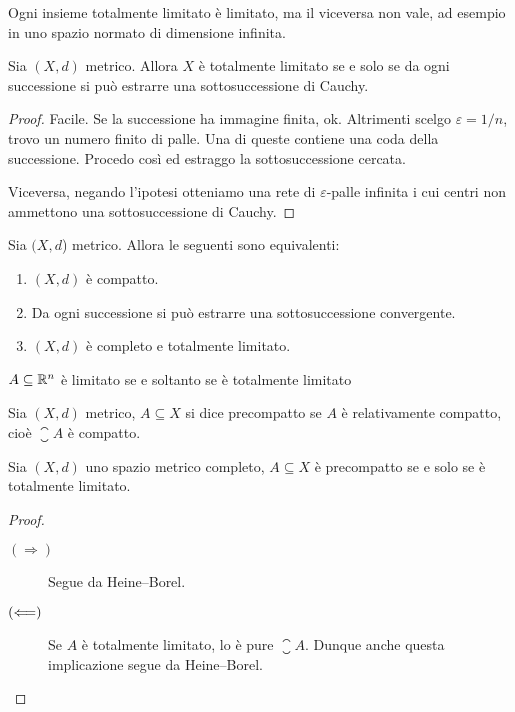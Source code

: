 \begin{remark}
	Ogni insieme totalmente limitato è limitato, ma il viceversa non vale, ad esempio in uno spazio normato di dimensione infinita.
\end{remark}

\begin{lemma}
	Sia $(X,d)$ metrico.
	Allora $X$ è totalmente limitato se e solo se da ogni successione si può estrarre una sottosuccessione di Cauchy.
\end{lemma}
\begin{proof}
	Facile. Se la successione ha immagine finita, ok. Altrimenti scelgo $\varepsilon =1/n$, trovo un numero finito di palle. Una di queste contiene una coda della successione. Procedo così ed estraggo la sottosuccessione cercata.

	Viceversa, negando l'ipotesi otteniamo una rete di $\varepsilon$-palle infinita i cui centri non ammettono una sottosuccessione di Cauchy.
\end{proof}

\begin{theorem}
\label{th:heine_borel}
	Sia $(X,d$) metrico. Allora le seguenti sono equivalenti:
	\begin{enumerate}
		\item $(X,d)$ è compatto.
		\item Da ogni successione si può estrarre una sottosuccessione convergente.
		\item $(X,d)$ è completo e totalmente limitato.
	\end{enumerate}
\end{theorem}

\begin{remark}
	$A \subseteq \mathbb{R}^n$ è limitato se e soltanto se è totalmente limitato
\end{remark}

\begin{definition}
	Sia $(X,d)$ metrico, $A \subseteq X$ si dice precompatto se $A$ è relativamente compatto, cioè $\closure A$ è compatto.
\end{definition}

\begin{corollary}
	Sia $(X,d)$ uno spazio metrico completo, $A \subseteq X$ è precompatto se e solo se è totalmente limitato.
\end{corollary}
\begin{proof}
	\leavevmode
	\begin{description}
		\item[$(\Longrightarrow)$] Segue da Heine--Borel.
		\item[$(\Longleftarrow)$] Se $A$ è totalmente limitato, lo è pure $\closure A$. Dunque anche questa implicazione segue da Heine--Borel.
	\end{description}
\end{proof}

